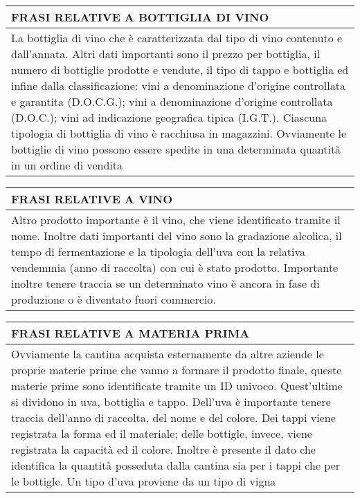 \begin{center}
	\begin{tabular}{P{16cm}}
		\toprule
		 \textbf {\large {FRASI RELATIVE A BOTTIGLIA DI VINO}} \\
		\midrule
		La bottiglia di vino che è caratterizzata dal tipo di vino contenuto e dall'annata. Altri dati importanti sono il prezzo per bottiglia, il numero di bottiglie prodotte e vendute, il tipo di tappo e bottiglia ed infine dalla classificazione: vini a denominazione d'origine controllata e garantita (D.O.C.G.); vini a denominazione d'origine controllata (D.O.C.); vini ad indicazione geografica tipica (I.G.T.). Ciascuna tipologia di bottiglia di vino è racchiusa in magazzini. Ovviamente le bottiglie di vino possono essere spedite in una determinata quantità in un ordine di vendita\\
		\bottomrule
	\end{tabular}

	\vspace{0.5cm}
	
	\begin{tabular}{P{16cm}}
		\toprule
		 \textbf {\large {FRASI RELATIVE A VINO}} \\
		\midrule
		Altro prodotto importante è il vino, che viene identificato tramite il nome. Inoltre dati importanti del vino sono la gradazione alcolica, il tempo di fermentazione e la tipologia dell'uva con la relativa vendemmia (anno di raccolta) con cui è stato prodotto. Importante inoltre tenere traccia se un determinato vino è ancora in fase di produzione o è diventato fuori commercio.\\
		\bottomrule
	\end{tabular}

	\vspace{0.5cm}
	
	\begin{tabular}{P{16cm}}
		\toprule
		 \textbf {\large {FRASI RELATIVE A MATERIA PRIMA}} \\
		\midrule
		Ovviamente la cantina acquista esternamente da altre aziende le proprie materie prime che vanno a formare il prodotto finale, queste materie prime sono identificate tramite un ID univoco. Quest'ultime si dividono in uva, bottiglia e tappo. Dell'uva è importante tenere traccia dell'anno di raccolta, del nome e del colore. Dei tappi viene registrata la forma ed il materiale; delle bottigle, invece, viene registrata la capacità ed il colore. Inoltre è presente il dato che identifica la quantità posseduta dalla cantina sia per i tappi che per le bottigle. Un tipo d'uva proviene da un tipo di vigna\\
		\bottomrule
	\end{tabular}


\end{center}
